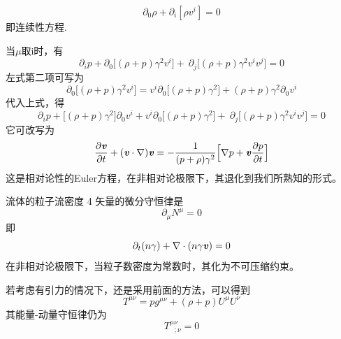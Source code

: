 \documentclass[a4paper]{book}
\newcommand{\xtjc}[1]{\textbf{\textit{#1}}}
\begin{document}
\begin{appendix}
\begin{equation}
	\partial_{0}\rho +\partial_{i}[\rho v^i]=0
\end{equation}
即连续性方程. \par 
当$\mu$取i时，有
\begin{equation}
\partial_{i}p+\partial_{0}\Big[(\rho+p)\gamma^{2}v^i\Big]+\ \partial_{j}\Big[(\rho+p)\gamma^{2}v^{i}v^{j}\Big]=0
\end{equation}
左式第二项可写为
\begin{equation}
	\partial_{0}\Big[\left(\rho+p\right)\gamma^{2}v^{i}\Big]=v^{i}\partial_{0}\Big[\left(\rho+p\right)\gamma^{2}\Big]+\left(\rho+p\right)\gamma^{2}\partial_{0}v^{i} 
\end{equation}
代入上式，得
\begin{equation}
	\partial_{i}p+\Big[(\rho+p)\gamma^{2}\Big]\partial_{0}v^i+v^i\partial_{0}\Big[(\rho+p)\gamma^{2}\Big]+\ \partial_{j}\Big[(\rho+p)\gamma^{2}v^{i}v^{j}\Big]=0
\end{equation}
它可改写为
\begin{equation}
	\frac{\partial \xtjc{v}}{\partial t}+(\xtjc{v}\cdot \nabla)\xtjc{v}=-\frac{1}{(p+\rho)\gamma^2}\Big[\nabla p+\xtjc{v}\frac{\partial p}{\partial t}\Big]
\end{equation}
这是相对论性的Euler方程，在非相对论极限下，其退化到我们所熟知的形式。\par 
流体的粒子流密度 4 矢量的微分守恒律是
\begin{equation}
	\partial_{\mu}N^{\mu}=0
\end{equation}
即
\begin{equation}
	\partial_{t}(n\gamma  )+\nabla \cdot(n \gamma \xtjc{v})=0
\end{equation}
在非相对论极限下，当粒子数密度为常数时，其化为不可压缩约束。\par 
若考虑有引力的情况下，还是采用前面的方法，可以得到
\begin{equation}
	T^{\mu \nu }=pg^{\mu \nu }+(\rho +p)U^{\mu }U^{\nu}
\end{equation}
其能量-动量守恒律仍为
\begin{equation}
T^{\mu \nu}_{~~~;\nu}=0
\end{equation}
\end{appendix}
\end{document}
